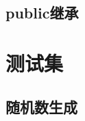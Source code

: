 \documentclass{../main.tex}{subfiles}
\begin{document}
\subsection{public继承}


\section{测试集}
\subsection{随机数生成}


\end{document}
